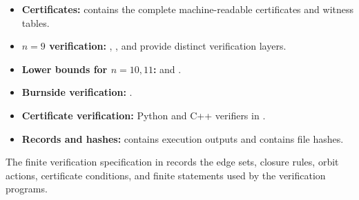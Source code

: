 \documentclass[11pt]{article}
\numberwithin{equation}{section}
\begin{document}
\begin{itemize}
\item \textbf{Certificates:}  contains the complete machine-readable certificates and witness tables.
\item \textbf{$n=9$ verification:} , , and  provide distinct verification layers.
\item \textbf{Lower bounds for $n=10,11$:}  and .
\item \textbf{Burnside verification:} .
\item \textbf{Certificate verification:} Python and C++ verifiers in .
\item \textbf{Records and hashes:}  contains execution outputs and  contains file hashes.
\end{itemize}

The finite verification specification in  records the edge sets, closure rules, orbit actions, certificate conditions, and finite statements used by the verification programs.
\end{document}
